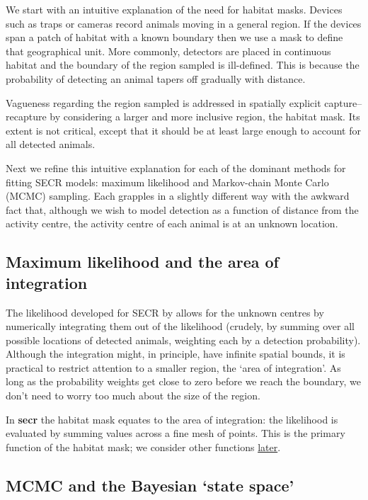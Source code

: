 \documentclass[
]{book}
\begin{document}
We start with an intuitive explanation of the need for habitat masks. Devices such as traps or cameras record animals moving in a general region. If the devices span a patch of habitat with a known boundary then we use a mask to define that geographical unit. More commonly, detectors are placed in continuous habitat and the boundary of the region sampled is ill-defined. This is because the probability of detecting an animal tapers off gradually with distance.

Vagueness regarding the region sampled is addressed in spatially explicit capture--recapture by considering a larger and more inclusive region, the habitat mask. Its extent is not critical, except that it should be at least large enough to account for all detected animals.

Next we refine this intuitive explanation for each of the dominant methods for fitting SECR models: maximum likelihood and Markov-chain Monte Carlo (MCMC) sampling. Each grapples in a slightly different way with the awkward fact that, although we wish to model detection as a function of distance from the activity centre, the activity centre of each animal is at an unknown location.

\subsection{Maximum likelihood and the area of integration}\label{maximum-likelihood-and-the-area-of-integration}

The likelihood developed for SECR by \citet{be08} allows for the unknown centres by numerically integrating them out of the likelihood (crudely, by summing over all possible locations of detected animals, weighting each by a detection probability). Although the integration might, in principle, have infinite spatial bounds, it is practical to restrict attention to a smaller region, the `area of integration'. As long as the probability weights get close to zero before we reach the boundary, we don't need to worry too much about the size of the region.

In \textbf{secr} the habitat mask equates to the area of integration: the likelihood is evaluated by summing values across a fine mesh of points. This is the primary function of the habitat mask; we consider other functions \hyperref[maskwhatfor]{later}.

\subsection{MCMC and the Bayesian `state space'}\label{mcmc-and-the-bayesian-state-space}
\end{document}
